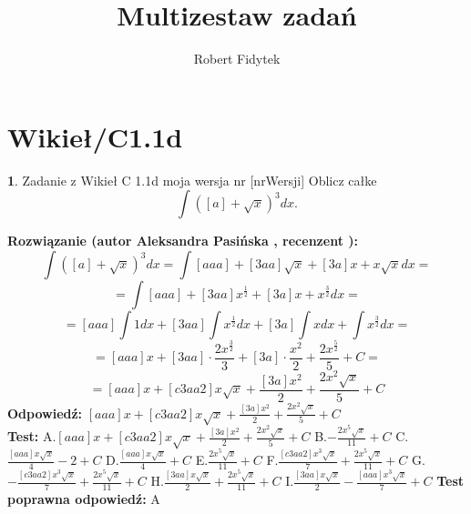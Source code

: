 \documentclass[12pt, a4paper]{article}
\title{Multizestaw zadań}
\author{Robert Fidytek}
\date{}
\theoremstyle{definition} %
\newtheorem{zad}{}
\newcommand{\kategoria}[1]{\section{#1}} %
\newcommand{\zadStart}[1]{\begin{zad}#1\newline} %
\newcommand{\zadStop}{\end{zad}}   %
\newcommand{\rozwStart}[2]{\noindent \textbf{Rozwiązanie (autor #1 , recenzent #2): }\newline} %
\newcommand{\rozwStop}{\newline}                                            %
\newcommand{\odpStart}{\noindent \textbf{Odpowiedź:}\newline}    %
\newcommand{\odpStop}{\newline}                                             %
\newcommand{\testStart}{\noindent \textbf{Test:}\newline} %
\newcommand{\testStop}{\newline} %
\newcommand{\kluczStart}{\noindent \textbf{Test poprawna odpowiedź:}\newline} %
\newcommand{\kluczStop}{\newline} %
\begin{document}
\maketitle


\kategoria{Wikieł/C1.1d}
\zadStart{Zadanie z Wikieł C 1.1d moja wersja nr [nrWersji]}
Oblicz całke $$\int ([a]+\sqrt{x})^3dx.$$
\zadStop
\rozwStart{Aleksandra Pasińska}{}
$$\int ([a]+\sqrt{x})^3dx=\int [aaa]+[3aa]\sqrt{x}+[3a]x+x\sqrt{x}dx=$$
$$=\int [aaa]+[3aa]x^{\frac{1}{2}}+[3a]x+x^{\frac{3}{2}}dx=$$ 
$$=[aaa]\int 1dx+[3aa]\int x^\frac{1}{2}dx+[3a]\int xdx+\int x^{\frac{3}{2}}dx=$$
$$=[aaa]x+[3aa]\cdot \frac{2x^{\frac{3}{2}}}{3}+[3a]\cdot \frac{x^2}{2}+\frac{2x^{\frac{5}{2}}}{5}+C=$$
$$=[aaa]x+[c3aa2]x\sqrt{x}+\frac{[3a]x^2}{2}+\frac{2x^2\sqrt{x}}{5}+C$$
\rozwStop
\odpStart
$[aaa]x+[c3aa2]x\sqrt{x}+\frac{[3a]x^2}{2}+\frac{2x^2\sqrt{x}}{5}+C$\\
\odpStop
\testStart
A.$[aaa]x+[c3aa2]x\sqrt{x}+\frac{[3a]x^2}{2}+\frac{2x^2\sqrt{x}}{5}+C$
B.$-\frac{2x^5\sqrt{x}}{11}+C$
C.$\frac{[aaa]x\sqrt{x}}{4}-2+C$
D.$\frac{[aaa]x\sqrt{x}}{4}+C$
E.$\frac{2x^5\sqrt{x}}{11}+C$
F.$\frac{[c3aa2]x^3\sqrt{x}}{7}+\frac{2x^5\sqrt{x}}{11}+C$
G.$-\frac{[c3aa2]x^3\sqrt{x}}{7}+\frac{2x^5\sqrt{x}}{11}+C$
H.$\frac{[3aa]x\sqrt{x}}{2}+\frac{2x^5\sqrt{x}}{11}+C$
I.$\frac{[3aa]x\sqrt{x}}{2}-\frac{[aaa]x^3\sqrt{x}}{7}+C$
\testStop
\kluczStart
A
\kluczStop
\end{document}
